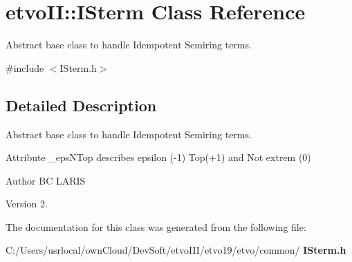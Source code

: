 \section{etvo\+II\+:\+:I\+Sterm Class Reference}
\label{classetvo_i_i_1_1_i_sterm}


Abstract base class to handle Idempotent Semiring terms.  




{\ttfamily \#include $<$I\+Sterm.\+h$>$}



\subsection{Detailed Description}
Abstract base class to handle Idempotent Semiring terms. 

Attribute \+\_\+eps\+N\+Top describes epsilon (-\/1) Top(+1) and Not extrem (0)

\begin{DoxyAuthor}{Author}
BC L\+A\+R\+IS 
\end{DoxyAuthor}
\begin{DoxyVersion}{Version}
2. 
\end{DoxyVersion}


The documentation for this class was generated from the following file\+:\begin{DoxyCompactItemize}
\item 
C\+:/\+Users/usrlocal/own\+Cloud/\+Dev\+Soft/etvo\+I\+I\+I/etvo19/etvo/common/\textbf{ I\+Sterm.\+h}\end{DoxyCompactItemize}
